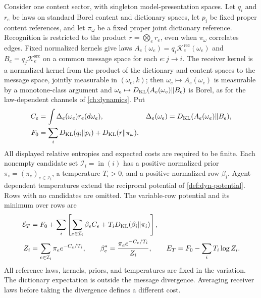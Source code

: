 Consider one content sector, with singleton model-presentation spaces. Let $q_i$ and $r_e$ be laws on standard Borel content and dictionary spaces, let $p_i$ be fixed proper content references, and let $\pi_\omega$ be a fixed proper joint dictionary reference. Recognition is restricted to the product $r=\bigotimes_e r_e$, even when $\pi_\omega$ correlates edges. Fixed normalized kernels give laws $A_e(\omega_e)=q_i\mathcal K_e^{\mathrm{rec}}(\omega_e)$ and $B_e=q_j\mathcal K_e^{\mathrm{src}}$ on a common message space for each $e:j\to i$. The receiver kernel is a normalized kernel from the product of the dictionary and content spaces to the message space, jointly measurable in $(\omega_e,k)$; then $\omega_e\mapsto A_e(\omega_e)$ is measurable by a monotone-class argument and $\omega_e\mapsto D_{\mathrm{KL}}(A_e(\omega_e)\Vert B_e)$ is Borel, as for the law-dependent channels of \cref{ch:dynamics}. Put
\begin{equation}
 \begin{aligned}
 C_e&=\int\Delta_e(\omega_e)r_e(d\omega_e),
 &\Delta_e(\omega_e)&=D_{\mathrm{KL}}(A_e(\omega_e)\Vert B_e),\\
 F_0&=\sum_iD_{\mathrm{KL}}(q_i\Vert p_i)+D_{\mathrm{KL}}(r\Vert\pi_\omega).
 \end{aligned}
 \label{it2:law-cost}
\end{equation}
All displayed relative entropies and expected costs are required to be finite. Each nonempty candidate set $\mathcal I_i=\operatorname{in}(i)$ has a positive normalized prior $\pi_i=(\pi_e)_{e\in\mathcal I_i}$, a temperature $T_i>0$, and a positive normalized row $\beta_i$. Agent-dependent temperatures extend the reciprocal potential of \cref{def:dyn-potential}. Rows with no candidates are omitted. The variable-row potential and its minimum over rows are
\begin{equation}
 \begin{aligned}
 \mathcal E_T&=F_0+\sum_i\left[\sum_{e\in\mathcal I_i}\beta_e C_e
                         +T_iD_{\mathrm{KL}}(\beta_i\Vert\pi_i)\right],\\
 Z_i&=\sum_{e\in\mathcal I_i}\pi_e e^{-C_e/T_i},
 \qquad \beta_e^*=\frac{\pi_e e^{-C_e/T_i}}{Z_i},
 \qquad E_T=F_0-\sum_iT_i\log Z_i.
 \end{aligned}
 \label{it2:row-objectives}
\end{equation}
All reference laws, kernels, priors, and temperatures are fixed in the variation. The dictionary expectation is outside the message divergence. Averaging receiver laws before taking the divergence defines a different cost.

